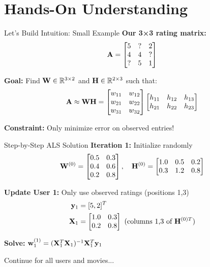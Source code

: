 \documentclass{beamer}
\begin{document}
\section{Hands-On Understanding}

\begin{frame}{Let's Build Intuition: Small Example}
\textbf{Our 3×3 rating matrix:}
\begin{equation*}
\mathbf{A} = \begin{bmatrix}
5 & ? & 2 \\
4 & 4 & ? \\
? & 5 & 1
\end{bmatrix}
\end{equation*}

\pause
\textbf{Goal:} Find $\mathbf{W} \in \mathbb{R}^{3 \times 2}$ and $\mathbf{H} \in \mathbb{R}^{2 \times 3}$ such that:
\begin{equation*}
\mathbf{A} \approx \mathbf{W} \mathbf{H} = \begin{bmatrix}
w_{11} & w_{12} \\
w_{21} & w_{22} \\
w_{31} & w_{32}
\end{bmatrix}
\begin{bmatrix}
h_{11} & h_{12} & h_{13} \\
h_{21} & h_{22} & h_{23}
\end{bmatrix}
\end{equation*}

\pause
\textbf{Constraint:} Only minimize error on observed entries!
\end{frame}

\begin{frame}{Step-by-Step ALS Solution}
\textbf{Iteration 1:} Initialize randomly
\begin{equation*}
\mathbf{W}^{(0)} = \begin{bmatrix} 0.5 & 0.3 \\ 0.4 & 0.6 \\ 0.2 & 0.8 \end{bmatrix}, \quad
\mathbf{H}^{(0)} = \begin{bmatrix} 1.0 & 0.5 & 0.2 \\ 0.3 & 1.2 & 0.8 \end{bmatrix}
\end{equation*}

\pause
\textbf{Update User 1:} Only use observed ratings (positions 1,3)
\begin{align}
\mathbf{y}_1 &= [5, 2]^T \\
\mathbf{X}_1 &= \begin{bmatrix} 1.0 & 0.3 \\ 0.2 & 0.8 \end{bmatrix} \text{ (columns 1,3 of } \mathbf{H}^{(0)T}\text{)}
\end{align}

\pause
\textbf{Solve:} $\mathbf{w}_1^{(1)} = (\mathbf{X}_1^T \mathbf{X}_1)^{-1} \mathbf{X}_1^T \mathbf{y}_1$

Continue for all users and movies...
\end{frame}
\end{document}

